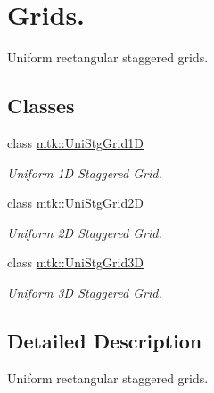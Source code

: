 \hypertarget{group__c06-grids}{\section{Grids.}
\label{group__c06-grids}
}


Uniform rectangular staggered grids.  


\subsection*{Classes}
\begin{DoxyCompactItemize}
\item 
class \hyperlink{classmtk_1_1UniStgGrid1D}{mtk\+::\+Uni\+Stg\+Grid1\+D}
\begin{DoxyCompactList}\small\item\em Uniform 1\+D Staggered Grid. \end{DoxyCompactList}\item 
class \hyperlink{classmtk_1_1UniStgGrid2D}{mtk\+::\+Uni\+Stg\+Grid2\+D}
\begin{DoxyCompactList}\small\item\em Uniform 2\+D Staggered Grid. \end{DoxyCompactList}\item 
class \hyperlink{classmtk_1_1UniStgGrid3D}{mtk\+::\+Uni\+Stg\+Grid3\+D}
\begin{DoxyCompactList}\small\item\em Uniform 3\+D Staggered Grid. \end{DoxyCompactList}\end{DoxyCompactItemize}


\subsection{Detailed Description}
Uniform rectangular staggered grids. 